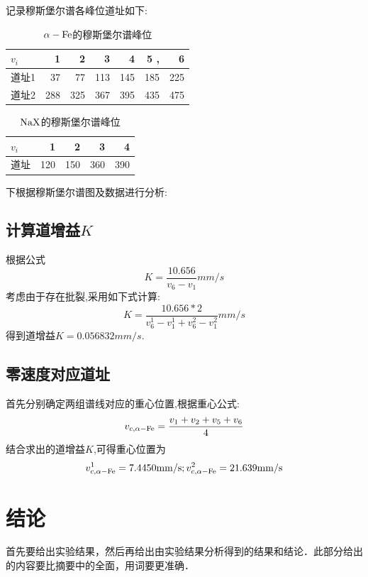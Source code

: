 \documentclass[aps,pre,12pt,preprint,onecolumn,showpacs,showkeys]{revtex4-1}
\begin{document}
记录穆斯堡尔谱各峰位道址如下:\par
\begin{table}[htbp]
    \begin{ruledtabular}
    \centering
        \begin{tabular}{lrrrrrr}
            \toprule
            {$v_i$} &   1 &    2 &    3 &    4 &    5 ,&    6 \\
            \midrule
            道址1 &  37 &  77 &  113 &  145 &  185 &  225 \\
            道址2 &  288 &  325 &  367 &  395 &  435 &  475 \\
            \bottomrule
        \end{tabular}
    \end{ruledtabular}
    \caption{$\alpha-\rm{Fe}$的穆斯堡尔谱峰位}
\end{table}
\begin{table}[htbp]
    \begin{ruledtabular}
    \centering
        \begin{tabular}{lrrrr}
            \toprule
            {$v_i$} &    1 &    2 &    3 &    4 \\
            \midrule
            道址 &  120 &  150 &  360 &  390 \\
            \bottomrule
        \end{tabular}
    \end{ruledtabular}
    \caption{$\rm{NaX}$的穆斯堡尔谱峰位}
\end{table}
下根据穆斯堡尔谱图及数据进行分析:
\subsection{计算道增益$K$}
根据公式
$$K=\frac{10.656}{v_6-v_1}\si{mm\per s}$$
考虑由于存在批裂,采用如下式计算:
$$K=\frac{10.656*2}{v^1_6-v^1_1+v^2_6-v^2_1}\si{mm\per s}$$
得到道增益$K=0.056832\si{mm\per s}$.
\subsection{零速度对应道址}
首先分别确定两组谱线对应的重心位置,根据重心公式:
$$v_{c,\alpha-\rm{Fe}}=\frac{v_1+v_2+v_5+v_6}{4}$$
结合求出的道增益$K$,可得重心位置为
$$v^1_{c,\alpha-\rm{Fe}}=7.4450\si{mm\per s};v^2_{c,\alpha-\rm{Fe}}=21.639\si{mm\per s}$$
\section{结论}
首先要给出实验结果，然后再给出由实验结果分析得到的结果和结论．此部分给出的内容要比摘要中的全面，用词要更准确．\par
\end{document}
